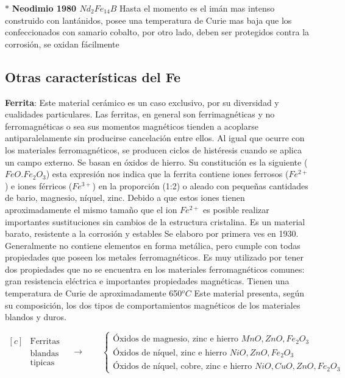 $\ast$ \textbf{Neodimio 1980 $Nd_{2}Fe_{14}B$} Hasta el momento es el imán mas intenso construido con lantánidos, posee una temperatura de Curie mas baja que los confeccionados con samario cobalto, por otro lado, deben ser protegidos contra la corrosión, se oxidan fácilmente

\subsection{Otras características del Fe}

\textbf{Ferrita}: Este material cerámico es un caso exclusivo, por su diversidad y cualidades particulares. Las ferritas, en general son ferrimagnéticas y no ferromagnéticas o sea sus momentos magnéticos tienden a
acoplarse antiparalelamente sin producirse cancelación entre ellos. Al igual que ocurre con los materiales ferromagnéticos, se producen ciclos de histéresis cuando se aplica un campo externo. Se basan en óxidos de hierro. Su constitución es la siguiente ($FeO.Fe_{2}O_{3}$) esta expresión nos indica que la ferrita contiene iones ferrosos ($Fe^{2+}$) e iones férricos ($Fe^{3+}$) en la proporción (1:2) o aleado con pequeñas cantidades de bario, magnesio, níquel, zinc. Debido a que estos iones tienen aproximadamente el mismo tamaño que el ion $Fe^{2+}$ es posible realizar importantes sustituciones sin cambios de la estructura cristalina. Es un material barato, resistente a la corrosión y estables Se elaboro por primera ves en 1930. Generalmente no contiene elementos en forma metálica, pero cumple con todas propiedades que poseen los metales ferromagnéticos. Es muy utilizado por tener dos propiedades que no se encuentra en los materiales ferromagnéticos comunes: gran resistencia eléctrica e importantes propiedades magnéticas. Tienen una temperatura de Curie de aproximadamente 650${^{o}C}$ Este material presenta, según su composición, los dos tipos de comportamientos magnéticos de los materiales blandos y duros.

\begin{equation*}
	\begin{aligned}[c]
		&\text{Ferritas}\\
		&\text{blandas}\\
		&\text{tipicas}
	\end{aligned}
\quad\rightarrow\qquad
\begin{cases}
  				\text{Óxidos de magnesio, zinc e hierro }MnO, ZnO, Fe_{2}O_{3}\\
 				\text{Óxidos de níquel, zinc e hierro }NiO, ZnO, Fe_{2}O_{3} \\
  				\text{Óxidos de níquel, cobre, zinc
e hierro } NiO, CuO, ZnO, Fe_{2}O_{3}
\end{cases}
\end{equation*}

